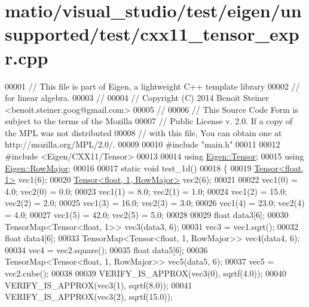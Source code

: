\hypertarget{matio_2visual__studio_2test_2eigen_2unsupported_2test_2cxx11__tensor__expr_8cpp_source}{}\section{matio/visual\+\_\+studio/test/eigen/unsupported/test/cxx11\+\_\+tensor\+\_\+expr.cpp}
\label{matio_2visual__studio_2test_2eigen_2unsupported_2test_2cxx11__tensor__expr_8cpp_source}

\begin{DoxyCode}
00001 \textcolor{comment}{// This file is part of Eigen, a lightweight C++ template library}
00002 \textcolor{comment}{// for linear algebra.}
00003 \textcolor{comment}{//}
00004 \textcolor{comment}{// Copyright (C) 2014 Benoit Steiner <benoit.steiner.goog@gmail.com>}
00005 \textcolor{comment}{//}
00006 \textcolor{comment}{// This Source Code Form is subject to the terms of the Mozilla}
00007 \textcolor{comment}{// Public License v. 2.0. If a copy of the MPL was not distributed}
00008 \textcolor{comment}{// with this file, You can obtain one at http://mozilla.org/MPL/2.0/.}
00009 
00010 \textcolor{preprocessor}{#include "main.h"}
00011 
00012 \textcolor{preprocessor}{#include <Eigen/CXX11/Tensor>}
00013 
00014 \textcolor{keyword}{using} \hyperlink{class_eigen_1_1_tensor}{Eigen::Tensor};
00015 \textcolor{keyword}{using} \hyperlink{group__enums_ggaacded1a18ae58b0f554751f6cdf9eb13acfcde9cd8677c5f7caf6bd603666aae3}{Eigen::RowMajor};
00016 
00017 \textcolor{keyword}{static} \textcolor{keywordtype}{void} test\_1d()
00018 \{
00019   \hyperlink{class_eigen_1_1_tensor}{Tensor<float, 1>} vec1(6);
00020   \hyperlink{class_eigen_1_1_tensor}{Tensor<float, 1, RowMajor>} vec2(6);
00021 
00022   vec1(0) = 4.0;  vec2(0) = 0.0;
00023   vec1(1) = 8.0;  vec2(1) = 1.0;
00024   vec1(2) = 15.0; vec2(2) = 2.0;
00025   vec1(3) = 16.0; vec2(3) = 3.0;
00026   vec1(4) = 23.0; vec2(4) = 4.0;
00027   vec1(5) = 42.0; vec2(5) = 5.0;
00028 
00029   \textcolor{keywordtype}{float} data3[6];
00030   TensorMap<Tensor<float, 1>> vec3(data3, 6);
00031   vec3 = vec1.sqrt();
00032   \textcolor{keywordtype}{float} data4[6];
00033   TensorMap<Tensor<float, 1, RowMajor>> vec4(data4, 6);
00034   vec4 = vec2.square();
00035   \textcolor{keywordtype}{float} data5[6];
00036   TensorMap<Tensor<float, 1, RowMajor>> vec5(data5, 6);
00037   vec5 = vec2.cube();
00038 
00039   VERIFY\_IS\_APPROX(vec3(0), sqrtf(4.0));
00040   VERIFY\_IS\_APPROX(vec3(1), sqrtf(8.0));
00041   VERIFY\_IS\_APPROX(vec3(2), sqrtf(15.0));

\end{DoxyCode}
